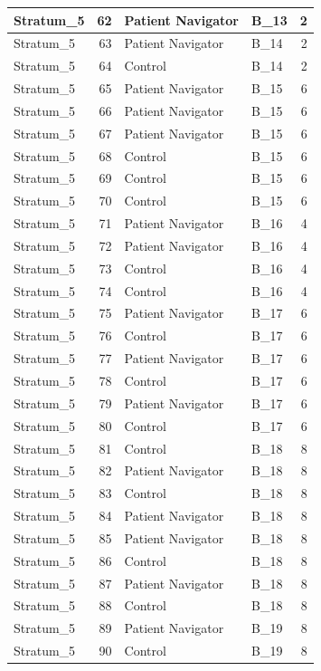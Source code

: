 \documentclass[
]{book}
\begin{document}
\begin{table}[H]
\begin{tabular}{l|r|l|l|r}
\hline
Stratum\_5 & 62 & Patient Navigator & B\_13 & 2\\
\hline
Stratum\_5 & 63 & Patient Navigator & B\_14 & 2\\
\hline
Stratum\_5 & 64 & Control & B\_14 & 2\\
\hline
Stratum\_5 & 65 & Patient Navigator & B\_15 & 6\\
\hline
Stratum\_5 & 66 & Patient Navigator & B\_15 & 6\\
\hline
Stratum\_5 & 67 & Patient Navigator & B\_15 & 6\\
\hline
Stratum\_5 & 68 & Control & B\_15 & 6\\
\hline
Stratum\_5 & 69 & Control & B\_15 & 6\\
\hline
Stratum\_5 & 70 & Control & B\_15 & 6\\
\hline
Stratum\_5 & 71 & Patient Navigator & B\_16 & 4\\
\hline
Stratum\_5 & 72 & Patient Navigator & B\_16 & 4\\
\hline
Stratum\_5 & 73 & Control & B\_16 & 4\\
\hline
Stratum\_5 & 74 & Control & B\_16 & 4\\
\hline
Stratum\_5 & 75 & Patient Navigator & B\_17 & 6\\
\hline
Stratum\_5 & 76 & Control & B\_17 & 6\\
\hline
Stratum\_5 & 77 & Patient Navigator & B\_17 & 6\\
\hline
Stratum\_5 & 78 & Control & B\_17 & 6\\
\hline
Stratum\_5 & 79 & Patient Navigator & B\_17 & 6\\
\hline
Stratum\_5 & 80 & Control & B\_17 & 6\\
\hline
Stratum\_5 & 81 & Control & B\_18 & 8\\
\hline
Stratum\_5 & 82 & Patient Navigator & B\_18 & 8\\
\hline
Stratum\_5 & 83 & Control & B\_18 & 8\\
\hline
Stratum\_5 & 84 & Patient Navigator & B\_18 & 8\\
\hline
Stratum\_5 & 85 & Patient Navigator & B\_18 & 8\\
\hline
Stratum\_5 & 86 & Control & B\_18 & 8\\
\hline
Stratum\_5 & 87 & Patient Navigator & B\_18 & 8\\
\hline
Stratum\_5 & 88 & Control & B\_18 & 8\\
\hline
Stratum\_5 & 89 & Patient Navigator & B\_19 & 8\\
\hline
Stratum\_5 & 90 & Control & B\_19 & 8\\

\end{tabular}
\end{table}
\end{document}
